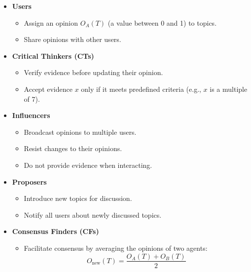 \documentclass[a4paper,12pt]{article}
\begin{document}
\begin{itemize}
    \item \textbf{Users}  
    \begin{itemize}
        \item Assign an opinion \( O_A(T) \) (a value between 0 and 1) to topics.  
        \item Share opinions with other users.  
    \end{itemize}

    \item \textbf{Critical Thinkers (CTs)}  
    \begin{itemize}
        \item Verify evidence before updating their opinion.  
        \item Accept evidence \( x \) only if it meets predefined criteria (e.g., \( x \) is a multiple of 7).  
    \end{itemize}

    \item \textbf{Influencers}  
    \begin{itemize}
        \item Broadcast opinions to multiple users.  
        \item Resist changes to their opinions.  
        \item Do not provide evidence when interacting.  
    \end{itemize}

    \item \textbf{Proposers}  
    \begin{itemize}
        \item Introduce new topics for discussion.  
        \item Notify all users about newly discussed topics.  
    \end{itemize}

    \item \textbf{Consensus Finders (CFs)}  
    \begin{itemize}
        \item Facilitate consensus by averaging the opinions of two agents:  
        \[
        O_{\text{new}}(T) = \frac{O_A(T) + O_B(T)}{2}
        \]
    \end{itemize}


\end{itemize}
\end{document}
